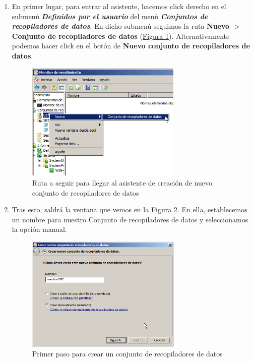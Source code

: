 \documentclass[10pt,a4paper,spanish]{article}
\numberwithin{equation}{section} %
\numberwithin{figure}{section} %
\numberwithin{table}{section} %
\begin{document}
\begin{enumerate}[1.]
    \item En primer lugar, para entrar al asistente, hacemos click derecho en el submenú \textit{\textbf{Definidos por el usuario}} del menú \textbf{\textit{Conjuntos de recopiladores de datos}}. En dicho submenú seguimos la ruta \textbf{Nuevo $>$ Conjunto de recopiladores de datos} (\hyperref[asistente]{Figura \ref*{asistente}}). Alternativamente podemos hacer click en el botón de \textbf{Nuevo conjunto de recopiladores de datos}.

    \begin{figure}[!h]
        \centering
        \includegraphics[width=0.7\textwidth]{11}
        \caption{Ruta a seguir para llegar al asistente de creación de nuevo conjunto de recopiladores de datos}
        \label{asistente}
    \end{figure}

    \item Tras esto, saldrá la ventana que vemos en la \hyperref[ventana]{Figura \ref*{ventana}}. En ella, establecemos un nombre para nuestro Conjunto de recopiladores de datos y seleccionamos la opción manual.

    \begin{figure}[!h]
        \centering
        \includegraphics[width=0.7\textwidth]{12}
        \caption{Primer paso para crear un conjunto de recopiladores de datos}
        \label{ventana}
    \end{figure}


\end{enumerate}
\end{document}
